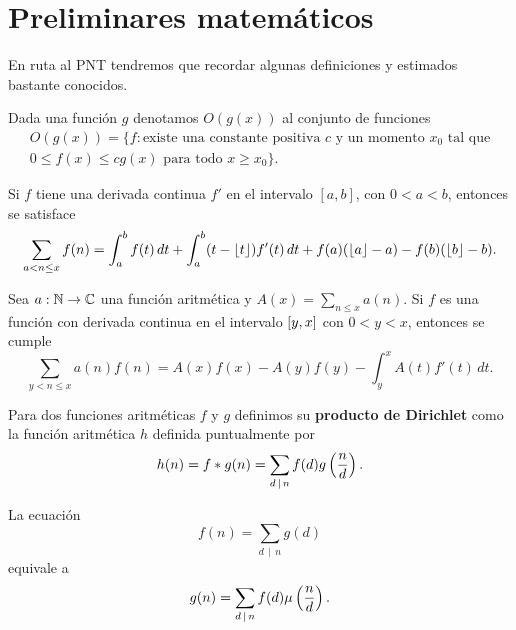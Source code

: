 \setlength{\headheight}{14.61858pt}
\pagestyle{fancy}

\chapter[Preliminares matem\'aticos]
{Preliminares matem\'aticos}
\label{ch:preliminaries}

En ruta al PNT
tendremos que recordar algunas definiciones y estimados bastante conocidos.

Dada una funci\'on \(g\) denotamos \(O(g(x))\) al conjunto de funciones
\[
  \begin{gathered}
    O(g(x)) = \{f : \text{existe una constante positiva } c \text{ y un momento } x_0 \text{ tal que} \\
    0 \leq f(x) \leq cg(x) \text{ para todo } x \geq x_0\}.
  \end{gathered}
\]

\begin{theorem}
\label{thm:euler}
Si \(f\) tiene una derivada continua \(f'\) en el intervalo \([a, b]\),
con \(0 < a < b\), entonces se satisface
\[
  \sum_{a < n \leq x} f(n) = \int_a^b f(t) \, dt +
  \int_a^b (t - \left\lfloor t \right\rfloor) f'(t) \, dt +
  f(a)(\left\lfloor a \right\rfloor - a) - f(b)(\left\lfloor b \right\rfloor - b).
\]
\end{theorem}

\begin{theorem}
\label{thm:abel}
Sea \(a: \mathbb{N} \to \mathbb{C}\) una funci\'on aritm\'etica y
\(A(x) = \sum_{n \leq x} a(n)\).
Si \(f\) es una funci\'on con derivada continua en el intervalo
\(\left[ y, x \right]\) con \(0 < y < x\), entonces se cumple
\[
  \sum_{y < n \leq x} a(n) f(n) = A(x) f(x) - A(y) f(y) - \int_y^x A(t) f'(t) \, dt.  
\]
\end{theorem}

Para dos funciones aritm\'eticas \(f\) y \(g\)
definimos su \textbf{producto de Dirichlet} como la funci\'on aritm\'etica
\(h\) definida puntualmente por 
\[
  h(n)
  = f * g(n)
  = \sum_{d \, \mid \, n} f(d) g \left( \frac{n}{d} \right).
\]

\begin{theorem}
  \label{thm:mobius}
  La ecuaci\'on
  \[
    f(n) = \sum_{d \, \mid \, n} g(d)  
  \]
  equivale a
  \[
    g(n) = \sum_{d \, \mid \, n} f(d) \mu \left( \frac{n}{d} \right).
  \]
\end{theorem}

